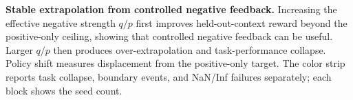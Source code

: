 \caption{
    \textbf{Stable extrapolation from controlled negative feedback.}
    Increasing the effective negative strength $q/p$ first improves
    held-out-context reward beyond the positive-only ceiling, showing
    that controlled negative feedback can be useful. Larger $q/p$ then
    produces over-extrapolation and task-performance collapse. Policy
    shift measures displacement from the positive-only target. The color
    strip reports task collapse, boundary events, and NaN/Inf failures
    separately; each block shows the seed count.
}
\label{fig:phase_transition_6_4_1}
